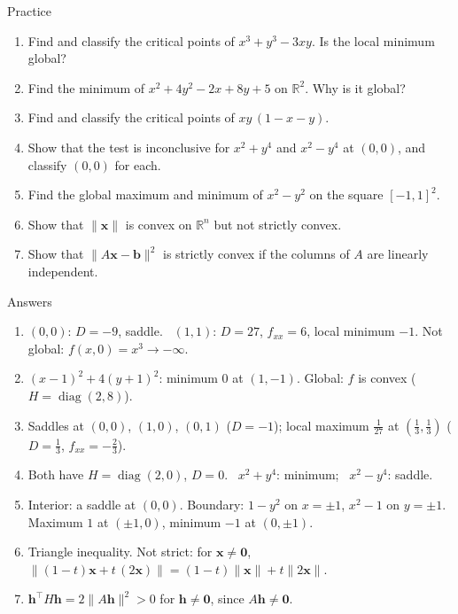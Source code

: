 \documentclass[10pt]{wosm-slides}
\newcommand{\R}{\mathbb{R}}
\newcommand{\norm}[1]{\lVert #1 \rVert}
\newcommand{\vx}{\mathbf{x}}
\newcommand{\vb}{\mathbf{b}}
\newcommand{\vh}{\mathbf{h}}
\begin{document}
\begin{frame}{Practice}
  \small
  \begin{enumerate}
    \item Find and classify the critical points of $x^3 + y^3 - 3xy$. Is the local minimum global?
    \item Find the minimum of $x^2 + 4y^2 - 2x + 8y + 5$ on $\R^2$. Why is it global?
    \item Find and classify the critical points of $xy\,(1 - x - y)$.
    \item Show that the test is inconclusive for $x^2 + y^4$ and $x^2 - y^4$ at $(0, 0)$, and
      classify $(0, 0)$ for each.
    \item Find the global maximum and minimum of $x^2 - y^2$ on the square $[-1, 1]^2$.
    \item Show that $\norm{\vx}$ is convex on $\R^n$ but not strictly convex.
    \item Show that $\norm{A\vx - \vb}^2$ is strictly convex if the columns of $A$ are linearly
      independent.
  \end{enumerate}
\end{frame}

\begin{frame}{Answers}
  \small
  \begin{enumerate}
    \item $(0, 0)$: $D = -9$, saddle. \ $(1, 1)$: $D = 27$, $f_{xx} = 6$, local minimum $-1$.
      Not global: $f(x, 0) = x^3 \to -\infty$.
    \item $(x - 1)^2 + 4(y + 1)^2$: minimum $0$ at $(1, -1)$. Global: $f$ is convex ($H = \operatorname{diag}(2, 8)$).
    \item Saddles at $(0, 0)$, $(1, 0)$, $(0, 1)$ ($D = -1$); local maximum $\frac1{27}$ at
      $(\frac13, \frac13)$ ($D = \frac13$, $f_{xx} = -\frac23$).
    \item Both have $H = \operatorname{diag}(2, 0)$, $D = 0$. \ $x^2 + y^4$: minimum; \ $x^2 - y^4$: saddle.
    \item Interior: a saddle at $(0, 0)$. Boundary: $1 - y^2$ on $x = \pm 1$, $x^2 - 1$ on $y = \pm 1$.
      Maximum $1$ at $(\pm 1, 0)$, minimum $-1$ at $(0, \pm 1)$.
    \item Triangle inequality. Not strict: for $\vx \ne \mathbf 0$, $\norm{(1 - t)\vx + t\,(2\vx)} = (1 - t)\norm{\vx} + t\norm{2\vx}$.
    \item $\vh^\top H\vh = 2\norm{A\vh}^2 > 0$ for $\vh \ne \mathbf 0$, since $A\vh \ne \mathbf 0$.
  \end{enumerate}
\end{frame}
\end{document}
